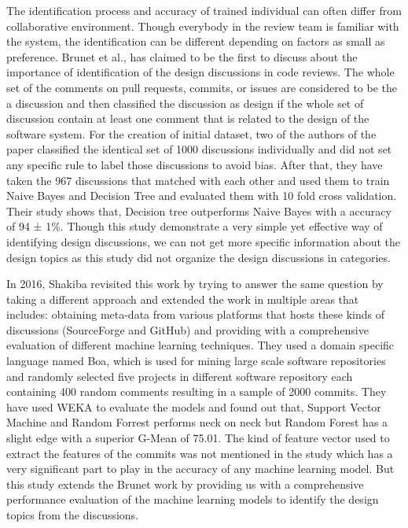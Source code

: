 The identification process and accuracy of trained individual can often differ from collaborative environment. Though everybody in the review team is familiar \cite{Sousa2017} with the system, the identification can be different depending on factors as small as preference. Brunet et al.,\cite{Brunet2014a} has claimed to be the first to discuss about the importance of identification of the design discussions in code reviews. The whole set of the comments on pull requests, commits, or issues are considered to be the a discussion and then classified the discussion as design if the whole set of discussion contain at least one comment that is related to the design of the software system. For the creation of initial dataset, two of the authors of the paper classified the identical set of 1000 discussions individually and did not set any specific rule to label those discussions to avoid bias. After that, they have taken the 967 discussions that matched with each other and used them to train Naive Bayes and Decision Tree and evaluated them with 10 fold cross validation. Their study shows that, Decision tree outperforms Naive Bayes with a accuracy of 94 ± 1\%. Though this study demonstrate a very simple yet effective way of identifying design discussions, we can not get more specific information about the design topics as this study did not organize the design discussions in categories. 

In 2016, Shakiba \cite{Shakiba2016} revisited this work by trying to answer the same question by taking a different approach and extended the work in multiple areas that includes: obtaining meta-data from various platforms that hosts these kinds of discussions (SourceForge and GitHub) and providing with a comprehensive evaluation of different machine learning techniques. They used a domain specific language named Boa, which is used for mining large scale software repositories and randomly selected five projects in different software repository each containing 400 random comments resulting in a sample of 2000 commits. They have used WEKA to evaluate the models and found out that, Support Vector Machine and Random Forrest performs neck on neck but Random Forest has a slight edge with a superior G-Mean of 75.01. The kind of feature vector used to extract the features of the commits was not mentioned in the study which has a very significant part to play in the accuracy of any machine learning model. But this study extends the Brunet work by providing us with a comprehensive performance evaluation of the machine learning models to identify the design topics from the discussions.

